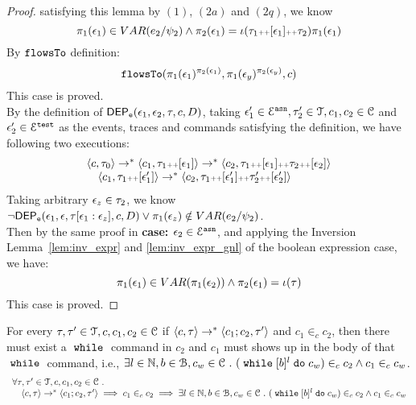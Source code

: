 \begin{proof}
satisfying this lemma by $(1)$, $(2a)$ and $(2q)$, 
we know
\[
  \pi_1(\mathtt{\epsilon}_1) \in VAR(e_2 / \psi_2) \land {\pi_2(\ensuremath{\mathtt{\epsilon}}_1)} = \iota(\mathtt{\tau}_1 {\scriptscriptstyle ++} [\mathtt{\epsilon}_1] {\scriptscriptstyle ++} \mathtt{\tau}_2) \pi_1(\mathtt{\epsilon}_1) 
\]
%
By $\mathtt{flowsTo}$ definition:
\[
  \mathtt{flowsTo}(\pi_1(\mathtt{\epsilon}_1)^{\pi_2(\mathtt{\epsilon}_1)}, \pi_1(\mathtt{\epsilon}_y)^{\pi_2(\mathtt{\epsilon}_y)}, c)
\]
This case is proved.
%
\caseL{$\event_2 \in \eventset^{\test}$}
\\
By the definition of $\mathsf{DEP_{\mathtt{e}}}(\mathtt{\epsilon}_1, \mathtt{\epsilon}_2, \mathtt{\tau}, c, D)$, 
taking $ \mathtt{\epsilon}_1' \in \mathcal{E}^{\mathtt{{asn}}},
\mathtt{\tau}_2' \in \mathcal{T}, c_1, c_2 \in \mathcal{C}$ and $\mathtt{\epsilon}_2' \in \mathcal{E}^{\mathtt{{test}}}$
 as the events, traces and commands satisfying the definition,
 we have following two executions:
%
\[
\begin{array}{l}
\langle c, \mathtt{\tau}_0 \rangle \rightarrow^{*}
\langle c_1, \mathtt{\tau}_1 {\scriptscriptstyle ++} [\mathtt{\epsilon}_1] \rangle \rightarrow^{*} \langle c_2, \mathtt{\tau}_1 {\scriptscriptstyle ++} [\mathtt{\epsilon}_1] {\scriptscriptstyle ++} \mathtt{\tau}_2 {\scriptscriptstyle ++} [\mathtt{\epsilon}_2] \rangle 
\\ \quad
\langle c_1, \mathtt{\tau}_1 {\scriptscriptstyle ++} [\mathtt{\epsilon}_1'] \rangle \rightarrow^{*} \langle c_2, \mathtt{\tau}_1 {\scriptscriptstyle ++} [\mathtt{\epsilon}_1'] {\scriptscriptstyle ++} \mathtt{\tau}_2' {\scriptscriptstyle ++} [\mathtt{\epsilon}_2'] \rangle 
\end{array}
\]
%
Taking arbitrary $\mathtt{\epsilon}_z \in \mathtt{\tau}_2$, we know 
$\neg \mathsf{DEP_{\mathtt{e}}}(\mathtt{\epsilon}_1, \mathtt{\epsilon}, \mathtt{\tau}[\mathtt{\epsilon}_1:\mathtt{\epsilon}_z], c, D)
\lor  \pi_1(\mathtt{\epsilon}_z) \notin VAR(e_2 / \psi_2)$.
\\
Then by the same proof in \textbf{case: $\mathtt{\epsilon}_2 \in \mathcal{E}^{\mathtt{{asn}}}$}, and applying the Inversion Lemma~\ref{lem:inv_expr} and \ref{lem:inv_expr_gnl} of the boolean expression case,
we have:
\[ 
	\pi_1(\mathtt{\epsilon}_1) \in VAR(\pi_1(\mathtt{\epsilon}_2)) \land {\pi_2(\ensuremath{\mathtt{\epsilon}}_1)} = \iota(\mathtt{\tau})
	\]
	This case is proved.
\end{proof}
%

%
\begin{lem}
	\label{lem:inv_while}
	For every $\mathtt{\tau}, \mathtt{\tau}' \in \mathcal{T}, c, c_1, c_2 \in \mathcal{C}$ 
	if $ \langle c, \mathtt{\tau} \rangle \rightarrow^* \langle c_1; c_2, \mathtt{\tau}' \rangle$ and 
	$c_1 \in_c c_2$, 
	then there must exist a $\;\mathtt{while}\;$ command in $c_2$ and $c_1$ must shows up in the body of that $\;\mathtt{while}\;$ command,
	 i.e., $\exists l \in \mathbb{N}, b \in \mathcal{B}, c_w \in \mathcal{C} ~.~ 
	(\;\mathtt{while}\; [b]^l \;\mathtt{do}\; c_w) \in_c c_2 \land c_1 \in_c c_w$.
	\[
	\begin{array}{l}
	\forall \mathtt{\tau}, \mathtt{\tau}' \in \mathcal{T}, c, c_1, c_2 \in \mathcal{C} ~.~
		\\ \quad
		\langle c, \mathtt{\tau} \rangle \rightarrow^* \langle c_1; c_2, \mathtt{\tau}' \rangle
		\implies
		c_1 \in_c c_2
		\implies
		\exists l \in \mathbb{N}, b \in \mathcal{B}, c_w \in \mathcal{C} ~.~ 
		(\;\mathtt{while}\; [b]^l \;\mathtt{do}\; c_w) \in_c c_2 \land c_1 \in_c c_w
	\end{array}
	\]
	\end{lem}	
